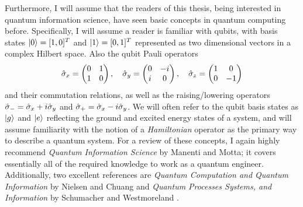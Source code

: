 Furthermore, I will assume that the readers of this thesis, being interested in quantum information science, have seen basic concepts in quantum computing before. Specifically, I will assume a reader is familiar with qubits, with basis states $\lvert0\rangle = [1, 0]^T$ and $\lvert1\rangle = [0, 1]^T$ represented as two dimensional vectors in a complex Hilbert space. Also the qubit Pauli operators
\begin{equation}
    \hat{\sigma}_x = \begin{pmatrix}
        0 & 1 \\ 1 & 0
    \end{pmatrix}, \quad \hat{\sigma}_y = \begin{pmatrix}
        0 & -i \\ i & 0
    \end{pmatrix}, \quad \hat{\sigma}_z = \begin{pmatrix}
        1 & 0 \\ 0 & -1
    \end{pmatrix}
\end{equation}
and their commutation relations, as well as the raising/lowering operators $\hat{\sigma}_- = \hat{\sigma}_x + i\hat{\sigma}_y$ and $\hat{\sigma}_+ = \hat{\sigma}_x - i\hat{\sigma}_y$. We will often refer to the qubit basis states as $\lvert g\rangle$ and $\lvert e\rangle$ reflecting the ground and excited energy states of a system, and will assume familiarity with the notion of a \textit{Hamiltonian} operator as the primary way to describe a quantum system. For a review of these concepts, I again highly recommend \textit{Quantum Information Science} by Manenti and Motta; it covers essentially all of the required knowledge to work as a quantum engineer. Additionally, two excellent references are \textit{Quantum Computation and Quantum Information} by Nielsen and Chuang \cite{ike-and-mike} and \textit{Quantum Processes Systems, and Information} by Schumacher and Westmoreland \cite{schumacher2010quantum}. 

\printbibliography[heading=subbibliography, title = References]
